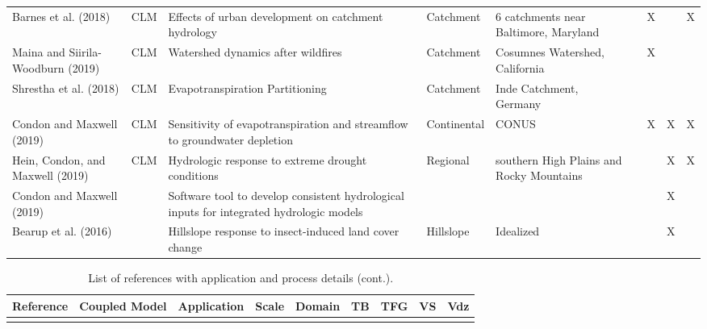 {\begin{table}
\begin{tabular}{ l  p{1.5cm} p{2cm} p{1.5cm} p{1.5cm} | c | c | c | c }
\cite{Barnes2018} Barnes et al. (2018) & CLM & Effects of urban development on catchment hydrology & Catchment & 6 catchments near Baltimore, Maryland & &X & &X \\
\cite{Maina2019} Maina and Siirila-Woodburn (2019) & CLM & Watershed dynamics after wildfires & Catchment & Cosumnes Watershed, California & &X & & \\
\cite{Shrestha2018} Shrestha et al. (2018) & CLM & Evapotranspiration Partitioning & Catchment & Inde Catchment, Germany & & & & \\
\cite{Condon2019a} Condon and Maxwell (2019) & CLM & Sensitivity of evapotranspiration and streamflow to groundwater depletion & Continental & CONUS & &X &X &X \\
\cite{Hein2019} Hein, Condon, and Maxwell (2019) & CLM & Hydrologic response to extreme drought conditions & Regional & southern High Plains and Rocky Mountains & & &X &X \\
\cite{Condon2019b} Condon and Maxwell (2019) &  & Software tool to develop consistent hydrological inputs for integrated hydrologic models &  &  & & &X & \\	
\cite{Bearup2016} Bearup et al. (2016) &  & Hillslope response to insect-induced land cover change & Hillslope & Idealized & & &X & \\

\end{tabular}
\label{pfref11}
\end{table}


\begin{table} \center
\renewcommand{\arraystretch}{2.5}
\center
\caption{List of \parflow{} references with application and process details (cont.).}
\begin{tabular}{ l  p{1.5cm} p{2cm} p{1.5cm} p{1.5cm} | c | c | c | c }
\bf{Reference} & \bf{Coupled Model} & \bf{Application} & \bf{Scale} & \bf{Domain} & \bf{TB} & \bf{TFG} & \bf{VS} & \bf{Vdz} \\   
\hline{}


\end{tabular}
\end{table}}
